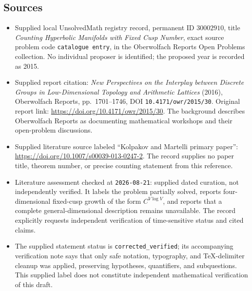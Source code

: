 \documentclass[11pt]{article}
\begin{document}
\subsection{Sources}
\begin{itemize}
\item Supplied local UnsolvedMath registry record, permanent ID \(30002910\), title \emph{Counting Hyperbolic Manifolds with Fixed Cusp Number}, exact source problem code \texttt{catalogue entry}, in the Oberwolfach Reports Open Problems collection. No individual proposer is identified; the proposed year is recorded as 2015.
\item Supplied report citation: \emph{New Perspectives on the Interplay between Discrete Groups in Low-Dimensional Topology and Arithmetic Lattices} (2016), Oberwolfach Reports, pp.~1701--1746, DOI \texttt{10.4171/owr/2015/30}. Original report link: \url{https://doi.org/10.4171/owr/2015/30}. The background describes Oberwolfach Reports as documenting mathematical workshops and their open-problem discussions.
\item Supplied literature source labeled ``Kolpakov and Martelli primary paper'': \url{https://doi.org/10.1007/s00039-013-0247-2}. The record supplies no paper title, theorem number, or precise counting statement from this reference.
\item Literature assessment checked at \texttt{2026-08-21}: supplied dated curation, not independently verified. It labels the problem partially solved, reports four-dimensional fixed-cusp growth of the form \(C^{V\log V}\), and reports that a complete general-dimensional description remains unavailable. The record explicitly requests independent verification of time-sensitive status and cited claims.
\item The supplied statement status is \texttt{corrected\_verified}; its accompanying verification note says that only safe notation, typography, and TeX-delimiter cleanup was applied, preserving hypotheses, quantifiers, and subquestions. This supplied label does not constitute independent mathematical verification of this draft.
\end{itemize}
\end{document}
